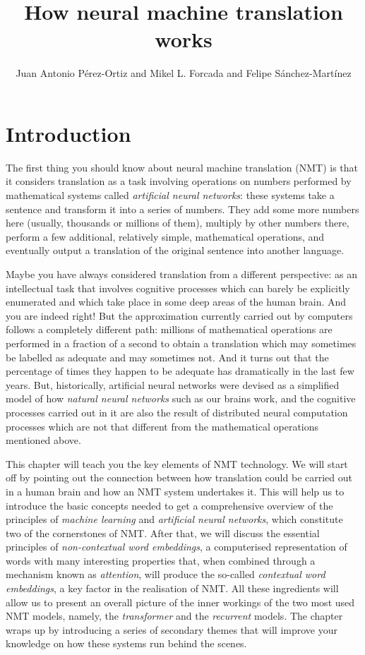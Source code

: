 \documentclass[output=paper,colorlinks,citecolor=brown]{langscibook}
\author{Juan Antonio Pérez-Ortiz\orcid{0000-0001-7659-8908}\affiliation{Universitat d'Alacant, Spain} and  Mikel L. Forcada\orcid{0000-0003-0843-6442}\affiliation{Universitat d'Alacant, Spain} and Felipe Sánchez-Martínez\orcid{0000-0002-2295-2630}\affiliation{Universitat d'Alacant, Spain}}
\title{How neural machine translation works}
\begin{document}
\maketitle

\section{Introduction}

The first thing you should know about neural machine translation (NMT) is that it considers translation as a task involving operations on numbers performed by mathematical systems called 
\emph{artificial neural networks}: 
these systems take a sentence and transform it into a series of numbers. They add some more numbers here (usually, thousands or millions of them), multiply by other numbers there, perform a few additional, relatively simple, mathematical operations, and eventually output a translation of the original sentence into another language. 

Maybe you have always considered translation from a different perspective: as an intellectual task that involves cognitive processes which can barely be explicitly enumerated and which take place in some deep areas of the human brain. And you are indeed right! But the approximation currently carried out by computers follows a completely different path: millions of mathematical operations are performed in a fraction of a second to obtain a translation which may sometimes be labelled as adequate and may sometimes not. And it turns out that the percentage of times they happen to be adequate has dramatically in the last few years. But, historically, artificial neural networks were devised as a simplified model of how \emph{natural neural networks} such as our brains work, and the cognitive processes carried out in it are also the result of distributed neural computation processes which are not that different from the mathematical operations mentioned above.

This chapter will teach you the key elements of 
NMT technology.
We will start off by pointing out the connection between how translation could be carried out in a human brain and how an NMT system undertakes it. This will help us to introduce the basic concepts needed to get a comprehensive overview of the principles of \emph{machine learning} and 
\emph{artificial neural networks},
which constitute two of the cornerstones of NMT. After that, we will discuss the essential principles of \emph{non-contextual word embeddings}, a computerised representation of words with many interesting properties that, when combined through a mechanism known as \emph{attention}, will produce the so-called \emph{contextual word embeddings}, 
a key factor in the realisation of NMT. All these ingredients will allow us to present an overall picture of the inner workings of the two most used NMT models, namely, the \emph{transformer} and the \emph{recurrent} models. 
The chapter 
wraps up by
introducing a series of secondary themes that will improve your knowledge on how these systems run behind the scenes.
\end{document}
